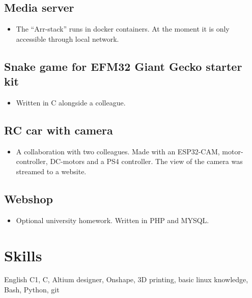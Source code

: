 \documentclass{article}
\begin{document}
\subsection{Media server}
\begin{itemize}
  \item The \enquote{Arr-stack} runs in docker containers. At the moment it is only accessible through local network.
\end{itemize}

\subsection{Snake game for EFM32 Giant Gecko starter kit}
\begin{itemize}
  \item Written in C alongside a colleague.
\end{itemize}

\subsection{RC car with camera}
\begin{itemize}
  \item A collaboration with two colleagues. Made with an ESP32-CAM, motor-controller, DC-motors and a PS4 controller. The view of the camera was streamed to a website.
\end{itemize}

\subsection{Webshop}
\begin{itemize}
  \item Optional university homework. Written in PHP and MYSQL.
\end{itemize}

\section{\faCogs\enspace Skills}
\begin{description}
  \item English C1, C, Altium designer, Onshape, 3D printing, basic linux knowledge, Bash, Python, git
\end{description}
\end{document}
